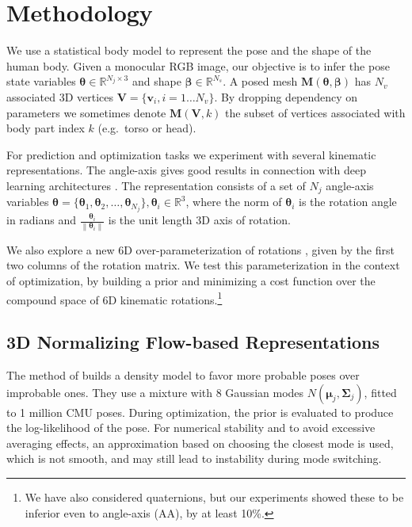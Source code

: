 \documentclass[runningheads]{llncs}
\newcommand{\thetab}{\bm{\theta}}
\newcommand{\betab}{\bm{\beta}}
\newcommand{\mub}{\bm{\mu}}
\newcommand{\eg}{e.g.\ }
\begin{document}
\section{Methodology}

We use a statistical body model \cite{SMPL2015,xu2020ghum} to represent the pose and the shape of the human body. Given a monocular RGB image, our objective is to infer the pose state variables $\thetab \in \mathbb{R}^{N_{j}\times3}$ and shape $\betab \in \mathbb{R}^{N_{s}}$. A posed mesh $\mathbf{M}(\thetab, \betab)$ has $N_{v}$ associated 3D vertices $\mathbf{V}=\{\mathbf{v}_{i}, i=1\ldots N_v\}$. By dropping dependency on parameters we sometimes denote $\mathbf{M}(\mathbf{V}, k)$ the subset of vertices associated with body part index $k$ (\eg torso or head). 


For prediction and optimization tasks we experiment with several kinematic representations. The angle-axis gives good results in connection with deep learning architectures \cite{Kanazawa2018,zanfir2018monocular}. The representation consists of a set of $N_{j}$ angle-axis variables $\thetab = \{\thetab_{1}, \thetab_{2}, \ldots, \thetab_{N_{j}}\}, \thetab_{i} \in \mathbb{R}^{3}$, where the norm of $\thetab_{i}$ is the rotation angle in radians and $\frac{\thetab_{i}}{\left\| \thetab_{i}\right\|}$ is the unit length 3D axis of rotation. 

We also explore a new 6D over-parameterization of rotations \cite{zhou2018continuity}, given by the first two columns of the rotation matrix.
We test this parameterization in the context of optimization, by building a prior and minimizing a cost function over the compound space of 6D kinematic rotations.\footnote{We have also considered quaternions, but our experiments showed these to be inferior even to  angle-axis (AA), by at least 10\%.}

\subsection{3D Normalizing Flow-based Representations}

 The method of \cite{bogo2016} builds a density model to favor more probable poses over improbable ones. They use a mixture with 8 Gaussian modes $N(\mub_j,\bm{\Sigma}_j)$, fitted to 1 million CMU poses. During optimization, the prior is evaluated to produce the log-likelihood of the pose. For numerical stability and to avoid excessive averaging effects, an approximation based on choosing the closest mode is used, which is not smooth, and may still lead to instability during mode switching. 
\end{document}
